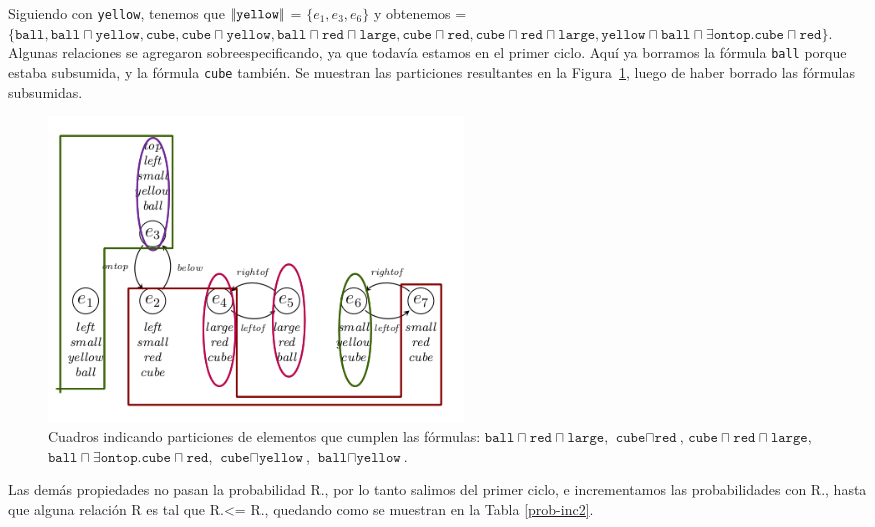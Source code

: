 Siguiendo con \texttt{yellow}, tenemos que $|\!|\texttt{yellow}|\!|$ = $\{e_1, e_3, e_6\}$ y obtenemos \RE= $\{\texttt{ball},\texttt{ball} \sqcap \texttt{yellow}, \texttt{cube}, \texttt{cube} \sqcap \texttt{yellow}, \texttt{ball} \sqcap \texttt{red} \sqcap \texttt{large}, \texttt{cube} \sqcap \texttt{red}, \texttt{cube} \sqcap \texttt{red} \sqcap \texttt{large}, \texttt{yellow} \sqcap \texttt{ball} \sqcap \exists \texttt{ontop}.\texttt{cube} \sqcap \texttt{red} \}$. Algunas relaciones se agregaron sobreespecificando, ya que todav\'ia estamos en el primer ciclo.
Aqu\'i ya borramos la f\'ormula \texttt{ball} porque estaba subsumida, y la f\'ormula \texttt{cube} tambi\'en. Se muestran las particiones resultantes en la Figura~\ref{fig-modelo9d}, luego de haber borrado las f\'ormulas subsumidas.

\begin{figure}[H]
\begin{center}
\includegraphics[width=11cm]{images/im/yellow.png}

\caption{Cuadros indicando particiones de elementos que cumplen las
  f\'ormulas: 
$\texttt{ball} \sqcap \texttt{red} \sqcap \texttt{large}$,
$\texttt{cube} \sqcap \texttt{red}$, 
$\texttt{cube} \sqcap \texttt{red} \sqcap \texttt{large}$,
$\texttt{ball} \sqcap \exists \texttt{ontop}. \texttt{cube} \sqcap
\texttt{red}$, 
$\texttt{cube} \sqcap \texttt{yellow}$, 
$\texttt{ball} \sqcap \texttt{yellow}$.}
\label{fig-modelo9d}
\end{center}
\end{figure}


Las dem\'as propiedades no pasan la probabilidad R.\randomuse, por lo tanto salimos del primer ciclo, e incrementamos las probabilidades con R.\incuse, hasta que alguna relaci\'on R es tal que R.\randomuse <= R.\puse, quedando como se muestran en la Tabla \ref{prob-inc2}.

